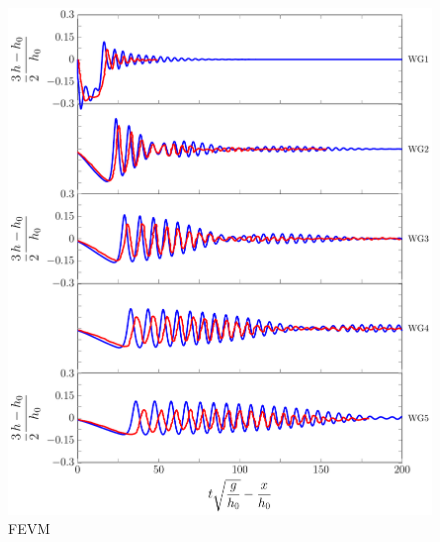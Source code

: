 \begin{figure}
	\centering
	\includegraphics[width=\textwidth]{./chp6/figures/Experiment/Segur/LongWGsFEVM3cm.pdf}
	\caption{FEVM}
	\label{fig:Segur3cmFEVM}
\end{figure}
